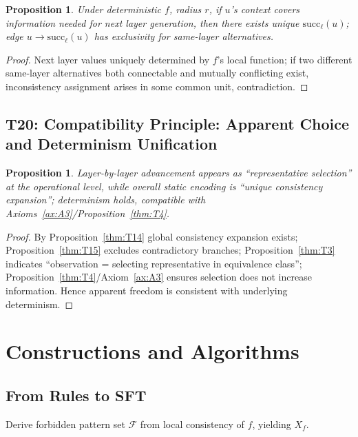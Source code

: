 \documentclass[11pt]{article}
\newtheorem{proposition}[theorem]{Proposition}
\theoremstyle{definition}
\theoremstyle{remark}
\begin{document}
\begin{proposition}\label{thm:T19}
Under deterministic \( f \), radius \( r \), if \( u \)'s context covers information needed for next layer generation, then there exists unique \( \mathrm{succ}_\ell(u) \); edge \( u \to \mathrm{succ}_\ell(u) \) has exclusivity for same-layer alternatives.
\end{proposition}

\begin{proof}
Next layer values uniquely determined by \( f \)'s local function; if two different same-layer alternatives both connectable and mutually conflicting exist, inconsistency assignment arises in some common unit, contradiction.
\end{proof}

\subsection{T20: Compatibility Principle: Apparent Choice and Determinism Unification}

\begin{proposition}\label{thm:T20}
Layer-by-layer advancement appears as ``representative selection'' at the operational level, while overall static encoding is ``unique consistency expansion''; determinism holds, compatible with Axioms~\ref{ax:A3}/Proposition~\ref{thm:T4}.
\end{proposition}

\begin{proof}
By Proposition~\ref{thm:T14} global consistency expansion exists; Proposition~\ref{thm:T15} excludes contradictory branches; Proposition~\ref{thm:T3} indicates ``observation = selecting representative in equivalence class''; Proposition~\ref{thm:T4}/Axiom~\ref{ax:A3} ensures selection does not increase information. Hence apparent freedom is consistent with underlying determinism.
\end{proof}

\section{Constructions and Algorithms}

\subsection{From Rules to SFT}
Derive forbidden pattern set \( \mathcal{F} \) from local consistency of \( f \), yielding \( X_f \).
\end{document}
